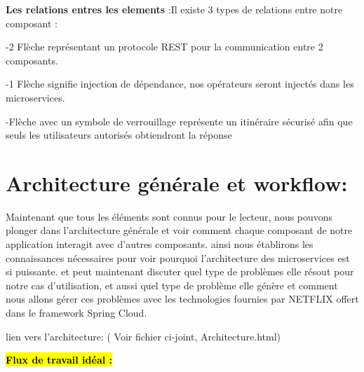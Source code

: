  \begin{figure}[h]
\centering
    \centering
    \qquad
\end{figure}

\textbf{Les relations entres les elements} :Il existe 3 types de relations entre notre composant :

-2 Flèche représentant un protocole REST pour la communication entre 2 composants.

-1 Flèche signifie injection de dépendance, nos opérateurs seront injectés dans les microservices.

-Flèche avec un symbole de verrouillage représente un itinéraire sécurisé afin que seuls les utilisateurs autorisés obtiendront la réponse 

 \begin{figure}[h]
\centering
    \centering
    \qquad
     \centering
    \qquad
     \centering
\end{figure}

\section{Architecture générale et workflow: }

Maintenant que tous les éléments sont connus pour le lecteur, nous pouvons plonger dans l'architecture générale et voir comment chaque composant de notre application interagit avec d'autres composants. ainsi nous établirons les connaissances nécessaires pour voir pourquoi l'architecture des microservices est si puissante. et peut maintenant discuter quel type de problèmes elle résout pour notre cas d'utilisation, et aussi quel type de problème elle génère et comment nous allons gérer ces problèmes avec les technologies fournies par NETFLIX offert dans le framework Spring Cloud.


lien vers l'architecture: ( Voir fichier ci-joint, Architecture.html) 



\newpage
\hl{\textbf{Flux de travail idéal :}}


